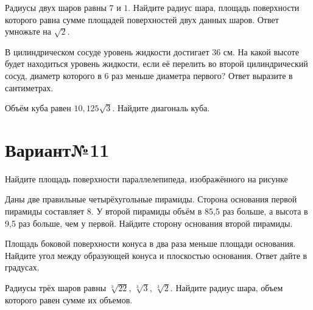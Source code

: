 \documentclass[4apaper]{article}
\begin{document}
\begin{taskBN}{4}
Радиусы двух шаров равны $7$ и $1$. Найдите радиус шара, площадь поверхности которого равна сумме площадей поверхностей двух данных шаров. Ответ умножьте на $\sqrt{2}$.
\end{taskBN}

\begin{taskBN}{5}
В цилиндрическом сосуде уровень жидкости достигает 36 см. На какой высоте будет находиться уровень жидкости, если её перелить во второй цилиндрический сосуд, диаметр которого в 6 раз меньше диаметра первого? Ответ выразите в сантиметрах.
\end{taskBN}

\begin{taskBN}{6}
Объём куба равен $10,125\sqrt{3}$. Найдите диагональ куба.
\end{taskBN}
\newpage\section*{Вариант№11}

\begin{taskBN}{1}
Найдите площадь поверхности параллелепипеда, изображённого на рисунке
\end{taskBN}
\vspace*{2cm}

\begin{taskBN}{2}
Даны две правильные четырёхугольные пирамиды. Сторона основания первой пирамиды составляет 8. У второй пирамиды объём в 85,5 раз больше, а высота в 9,5 раз больше, чем у первой. Найдите сторону основания второй пирамиды.
\end{taskBN}

\begin{taskBN}{3}
Площадь боковой поверхности конуса в два раза меньше площади основания. Найдите угол между образующей конуса и плоскостью основания. Ответ дайте в градусах.
\end{taskBN}

\begin{taskBN}{4}
Радиусы трёх шаров равны $\sqrt[3]{22}$, $\sqrt[3]{3}$, $\sqrt[3]{2}$. Найдите радиус шара, объем которого равен сумме их объемов.
\end{taskBN}
\end{document}
